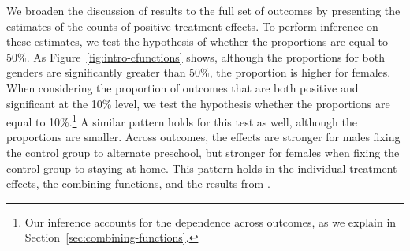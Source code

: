 We broaden the discussion of results to the full set of outcomes by presenting the estimates of the counts of positive treatment effects. To perform inference on these estimates, we test the hypothesis of whether the proportions are equal to 50\%. As Figure~\ref{fig:intro-cfunctions} shows, although the proportions for both genders are significantly greater than 50\%, the proportion is higher for females. When considering the proportion of outcomes that are both positive and significant at the 10\% level, we test the hypothesis whether the proportions are equal to 10\%.\footnote{Our inference accounts for the dependence across outcomes, as we explain in Section~\ref{sec:combining-functions}.} A similar pattern holds for this test as well, although the proportions are smaller. Across outcomes, the effects are stronger for males fixing the control group to alternate preschool, but stronger for females when fixing the control group to staying at home. This pattern holds in the individual treatment effects, the combining functions, and the results from \citet{Garcia_Heckman_Leaf_etal_2017_Comp_CBA_Unpublished}.

